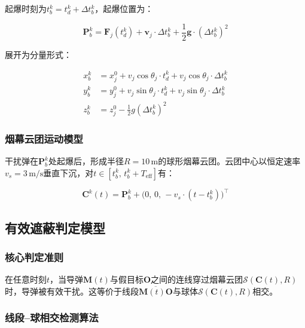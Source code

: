\documentclass[12pt,a4paper]{ctexart}
\newcommand{\vect}[1]{\boldsymbol{#1}}
\begin{document}
起爆时刻为$t_b^k = t_d^k + \Delta t_b^k$，起爆位置为：

\begin{equation}\label{eq:burst}
\vect{P}_b^k = \vect{F}_j(t_d^k) + \vect{v}_j \cdot \Delta t_b^k + \frac{1}{2}\vect{g} \cdot (\Delta t_b^k)^2
\end{equation}

展开为分量形式：

\begin{equation}\label{eq:burst_comp}
\begin{aligned}
x_b^k &= x_j^0 + v_j\cos\theta_j \cdot t_d^k + v_j\cos\theta_j \cdot \Delta t_b^k \\
y_b^k &= y_j^0 + v_j\sin\theta_j \cdot t_d^k + v_j\sin\theta_j \cdot \Delta t_b^k \\
z_b^k &= z_j^0 - \frac{1}{2}g(\Delta t_b^k)^2
\end{aligned}
\end{equation}

\subsubsection{烟幕云团运动模型}

干扰弹在$\vect{P}_b^k$处起爆后，形成半径$R=10\,\text{m}$的球形烟幕云团。云团中心以恒定速率$v_s=3\,\text{m/s}$垂直下沉，对$t \in [t_b^k,\, t_b^k+T_{\text{eff}}]$有：

\begin{equation}\label{eq:cloud}
\vect{C}^k(t) = \vect{P}_b^k + \bigl(0,\, 0,\, -v_s \cdot (t-t_b^k)\bigr)^\top
\end{equation}

\subsection{有效遮蔽判定模型}

\subsubsection{核心判定准则}

在任意时刻$t$，当导弹$\vect{M}(t)$与假目标$\vect{O}$之间的连线穿过烟幕云团$\mathcal{S}(\vect{C}(t), R)$时，导弹被有效干扰。这等价于线段$\overline{\vect{M}(t)\vect{O}}$与球体$\mathcal{S}(\vect{C}(t), R)$相交。

\subsubsection{线段--球相交检测算法}
\end{document}
